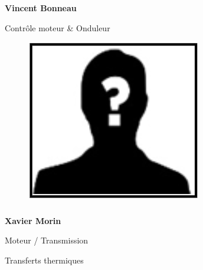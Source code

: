 \documentclass[a0paper,portrait]{baposter}
\begin{document}
\begin{poster}
{\subsubsection*{}
\vspace{2mm}
\textbf{Vincent Bonneau}

Contrôle moteur \& Onduleur


\begin{figure}
\includegraphics[width=.9\linewidth]{img/membres/membre_placeholder.png} 
\end{figure}
\subsubsection*{}
\vspace{2mm}
\textbf{Xavier Morin}

Moteur / Transmission

Transferts thermiques


\vspace{1cm}
%
%
%
%
%
%
}



\end{poster}
\end{document}

